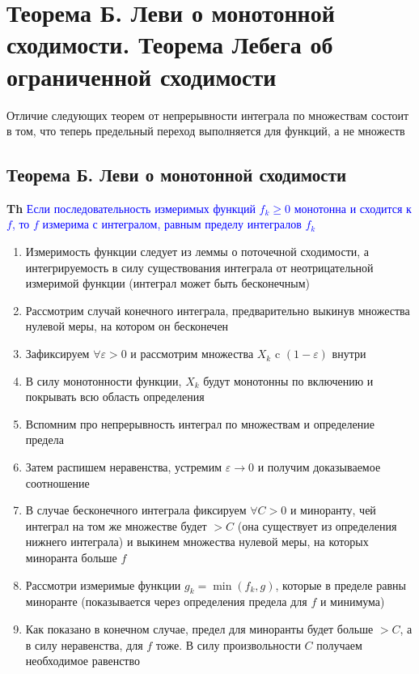 \documentclass[a4paper, 14pt]{article}
\begin{document}
%    
    
    \section{Теорема Б. Леви о монотонной сходимости.
    Теорема Лебега об ограниченной сходимости}
    
    Отличие следующих теорем от непрерывности интеграла по множествам состоит в том, что теперь предельный переход
    выполняется для функций, а не множеств
    
    \subsection{Теорема Б. Леви о монотонной сходимости}
    
    \textbf{Th} \textcolor{blue}{Если последовательность измеримых функций $f_k \geq 0$ монотонна и сходится к $f$,
        то $f$ измерима с интегралом, равным пределу интегралов $f_k$}
    
    \begin{enumerate}
        \item Измеримость функции следует из леммы о поточечной сходимости, а интегрируемость в силу
        существования интеграла от неотрицательной измеримой функции (интеграл может быть бесконечным)
        \item Рассмотрим случай конечного интеграла, предварительно выкинув множества нулевой меры, на котором он
        бесконечен
        \item Зафиксируем $\forall \varepsilon > 0$ и рассмотрим множества $X_k$ c $(1 - \varepsilon)$ внутри
        \item В силу монотонности функции, $X_k$ будут монотонны по включению и покрывать всю область определения
        \item Вспомним про непрерывность интеграл по множествам и определение предела
        \item Затем распишем неравенства, устремим $\varepsilon \rightarrow 0$ и получим доказываемое соотношение
        \item В случае бесконечного интеграла фиксируем $\forall C > 0$ и миноранту, чей интеграл на том же множестве
        будет $> C$ (она существует из определения нижнего интеграла) и выкинем множества нулевой меры, на
        которых миноранта больше $f$
        \item Рассмотри измеримые функции $g_k = \min(f_k, g)$, которые в пределе равны миноранте (показывается через
        определения предела для $f$ и минимума)
        \item Как показано в конечном случае, предел для миноранты будет больше $> C$, а в силу неравенства, для $f$
        тоже.
        В силу произвольности $C$ получаем необходимое равенство
    \end{enumerate}
    
\end{document}
